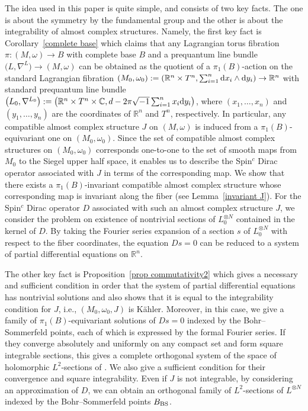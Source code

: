 \documentclass[pdftex]{sigma}
\numberwithin{equation}{section}
\newcommand{\C}{\mathbb{C}}
\newcommand{\R}{\mathbb{R}}
\begin{document}
The idea used in this paper is quite simple, and consists of two key facts.
The one is about the symmetry by the fundamental group and the other is about the integrability of almost complex structures.
Namely, the first key fact is Corollary~\ref{complete base} which claims that any Lagrangian torus fibration $\pi\colon (M,\omega)\to B$ with complete base $B$ and a prequantum line bundle~${\bigl(L,\nabla^L\bigr)\to (M,\omega )}$ can be obtained as the quotient of a $\pi_1(B)$-action on the standard Lagrangian fibration $(M_0, \omega_0):=( \R^n\times T^n, \sum_{i=1}^n{\rm d}x_i\wedge {\rm d}y_i)\to \R^n$ with standard prequantum line bundle $\bigl( L_0, \nabla^{L_0}\bigr):=\bigl(\R^n\times T^n\times \C , d-2\pi\sqrt{-1}\sum_{i=1}^nx_i {\rm d}y_i\bigr)$, where $(x_1,\ldots ,x_n)$ and $(y_1,\ldots ,y_n)$ are the coordinates of $\R^n$ and $T^n$, respectively. In particular, any compatible almost complex structure $J$ on $(M,\omega)$ is induced from a $\pi_1(B)$-equivariant one on $(M_0, \omega_0)$. Since the set of compatible almost complex structures on $(M_0, \omega_0)$ corresponds one-to-one to the set of smooth maps from $M_0$ to the Siegel upper half space, it enables us to describe the Spin${}^c$ Dirac operator associated with $J$ in terms of the corresponding map. We show that there exists a $\pi_1(B)$-invariant compatible almost complex structure whose corresponding map is invariant along the fiber (see Lemma~\ref{invariant J}). For the Spin${}^c$ Dirac operator $D$ associated with such an almost complex structure $J$, we consider the problem on existence of nontrivial sections of $L_0^{\otimes N}$ contained in the kernel of $D$. By taking the Fourier series expansion of a section $s$ of $L_0^{\otimes N}$ with respect to the fiber coordinates, the equation $Ds=0$ can be reduced to a system of partial differential equations on $\R^n$.

The other key fact is Proposition~\ref{prop commutativity2} which gives a necessary and sufficient condition in order that the system of partial differential equations has nontrivial solutions and also shows that it is equal to the integrability condition for $J$, i.e., $\left(M_0, \omega_0, J\right)$ is K\"ahler. Moreover, in this case, we give a family of $\pi_1(B)$-equivariant solutions of $Ds=0$ indexed by the Bohr--Sommerfeld points, each of which is expressed by the formal Fourier series. If they converge absolutely and uniformly on any compact set and form square integrable sections, this gives a complete orthogonal system of the space of holomorphic $L^2$-sections of . We also give a sufficient condition for their convergence and square integrability. Even if $J$ is not integrable, by considering an approximation of $D$, we can obtain an orthogonal family of $L^2$-sections of $L^{\otimes N}$ indexed by the Bohr--Sommerfeld points $B_{\rm BS}$.
\end{document}
